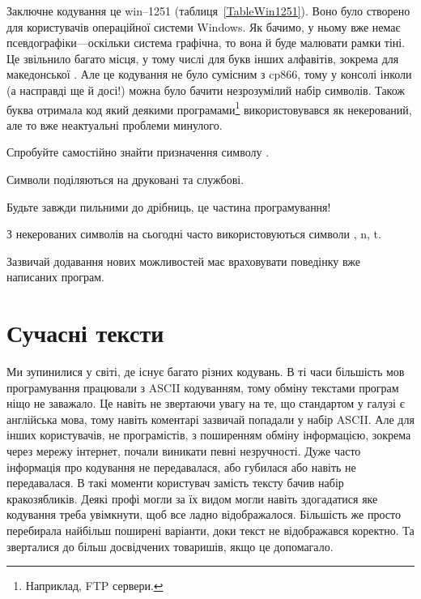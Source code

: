Заключне кодування це win--1251 (таблиця~\ref{TableWin1251}).
Воно було створено для користувачів операційної системи Windows.
Як бачимо, у ньому вже немає псевдографіки---оскільки система графічна, то вона й буде малювати рамки тіні.
Це звільнило багато місця, у тому числі для букв інших алфавітів, зокрема для македонської .
Але це кодування не було сумісним з cp866, тому у консолі інколи (а насправді ще й досі!) можна було бачити незрозумілий набір символів.
Також буква  отримала код  який деякими програмами\footnote{Наприклад, FTP сервери.} використовувався як некерований, але то вже неактуальні проблеми минулого.

\begin{exercise}
Спробуйте самостійно знайти призначення символу .
\end{exercise}

\begin{summary}
\item Символи поділяються на друковані та службові.
\item Будьте завжди пильними до дрібниць, це частина програмування!
\item З некерованих символів на сьогодні часто використовуються символи , \chesc n, \chesc t.
\item Зазвичай додавання нових можливостей має враховувати поведінку вже написаних програм.
\end{summary}

\section{Сучасні тексти}

Ми зупинилися у світі, де існує багато різних кодувань.
В ті часи більшість мов програмування працювали з ASCII кодуванням, тому обміну текстами програм ніщо не заважало.
Це навіть не звертаючи увагу на те, що стандартом у галузі є англійська мова, тому навіть коментарі зазвичай попадали у набір ASCII.
Але для інших користувачів, не програмістів, з поширенням обміну інформацією, зокрема через мережу інтернет, почали виникати певні незручності.
Дуже часто інформація про кодування не передавалася, або губилася або навіть не передавалася.
В такі моменти користувач замість тексту бачив набір кракозябликів.
Деякі профі могли за їх видом могли навіть здогадатися яке кодування треба увімкнути, щоб все ладно відображалося.
Більшість же просто перебирала найбільш поширені варіанти, доки текст не відображався коректно.
Та зверталися до більш досвідчених товаришів, якщо це допомагало.


